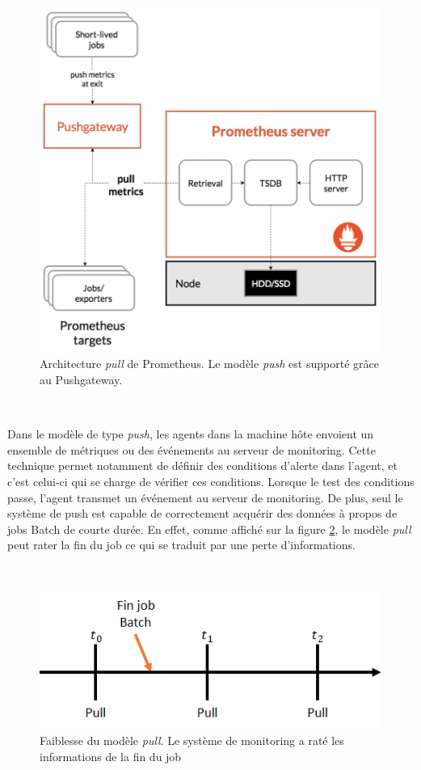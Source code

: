 \begin{figure}[ht!]
  \centering
  \includegraphics[scale=0.4]{img/state_of_the_art/prometheus_archi_simple.png}
  \caption{Architecture \textit{pull} de Prometheus. Le modèle \textit{push} est supporté grâce au Pushgateway.}
  \label{fig:archi_prom_simple}
\end{figure}

~

\noindent
Dans le modèle de type \textit{push}, les agents dans la machine hôte envoient un ensemble de métriques ou des événements au serveur de monitoring. Cette technique permet notamment de définir des conditions d'alerte dans l'agent, et c'est celui-ci qui se charge de vérifier ces conditions. Lorsque le test des conditions passe, l'agent transmet un événement au serveur de monitoring. De plus, seul le système de push est capable de correctement acquérir des données à propos de jobs Batch de courte durée. \cite{blog_monitoring, prometheus_tuto} En effet, comme affiché sur la figure \ref{fig:batch_end}, le modèle \textit{pull} peut rater la fin du job ce qui se traduit par une perte d'informations.

~

\begin{figure}[ht!]
  \centering
  \includegraphics{img/state_of_the_art/pull_batch_miss.png}
  \caption{Faiblesse du modèle \textit{pull}. Le système de monitoring a raté les informations de la fin du job}
  \label{fig:batch_end}
\end{figure}

